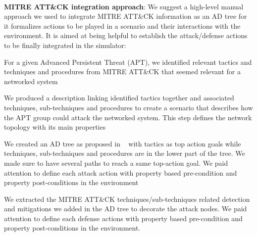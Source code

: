 \documentclass[conference]{IEEEtran}
\begin{document}
\

\noindent
\textbf{MITRE ATT\&CK integration approach}: We suggest a high-level manual approach we used to integrate MITRE ATT\&CK information as an AD tree for it formalizes actions to be played in a scenario and their interactions with the environment. It is aimed at being helpful to establish the attack/defense actions to be finally integrated in the simulator:
\begin{enumerate*}[label=\arabic*),itemjoin={;\quad}]

    \item For a given Advanced Persistent Threat (APT), we identified relevant tactics and techniques and procedures from MITRE ATT\&CK that seemed relevant for a networked system

    \item We produced a description linking identified tactics together and associated techniques, sub-techniques and procedures to create a scenario that describes how the APT group could attack the networked system. This step defines the network topology with its main properties

    \item We created an AD tree as proposed in ~\cite{BKordy2010} with tactics as top action goals while techniques, sub-techniques and procedures are in the lower part of the tree. We made sure to have several paths to reach a same top-action goal. We paid attention to define each attack action with property based pre-condition and property post-conditions in the environment

    \item We extracted the MITRE ATT\&CK techniques/sub-techniques related detection and mitigations we added in the AD tree to decorate the attack nodes. We paid attention to define each defense actions with property based pre-condition and property post-conditions in the environment.




\end{enumerate*}
\end{document}

